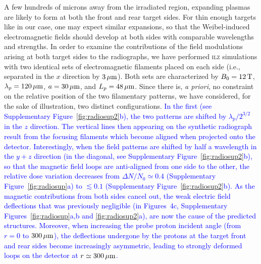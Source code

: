 \documentclass[aps,superscriptaddress]{revtex4}
\begin{document}
A few hundreds of microns away from the irradiated region, expanding plasmas are likely to form at both the front and rear target sides. For thin enough targets like in our case, one may expect similar expansions, so that the Weibel-induced electromagnetic fields should develop at both sides with comparable wavelengths and strengths. In order to examine the contributions of the field modulations arising at both target sides to the radiographs, we have performed \textsc{ilz} simulations with two identical sets of electromagnetic filaments placed on each side (i.e., separated in the $x$ direction by $3\,\rm \mu m$). Both sets are characterized by $B_0=12\,\rm T$, $\lambda_p=120\,\rm \mu m$, $a=30\,\rm \mu m$, and $L_p=48\,\rm \mu m$.
Since there is, \emph{a priori}, no constraint on the relative position of the two filamentary patterns, we have considered, for the sake of illustration, two distinct configurations. 
\textcolor{blue}{
In the first (see Supplementary Figure~\ref{fig:radiosup2}b), the two patterns are shifted by $\lambda_p/2^{3/2}$ in the $z$ direction. The vertical lines then appearing on the synthetic radiograph result from the focusing filaments which become aligned when projected onto the detector. Interestingly, when the field patterns are shifted by half a wavelength in the $y+z$ direction (in the diagonal, see Supplementary Figure~\ref{fig:radiosup2}b), so that the magnetic field loops are anti-aligned from one side to the other, the relative dose variation decreases from $\Delta N/N_0 \simeq 0.4$ (Supplementary Figure~\ref{fig:radiosup}a) to  $\lesssim 0.1$ (Supplementary Figure~\ref{fig:radiosup2}b). 
As the magnetic contributions from both sides cancel out, 
the weak electric field deflections that was previously negligible (in  Figures~4c, Supplementary Figures~\ref{fig:radiosup}a,b and  \ref{fig:radiosup2}a), are now the cause of the predicted structures. 
Moreover, when increasing the probe proton incident angle (from $r = 0$ to $300\,\rm\mu m$), 
the deflections undergone by the protons at the target front and rear sides become increasingly asymmetric, leading to strongly deformed loops on the detector at $r \simeq 300\,\rm\mu m$.
}
\end{document}
